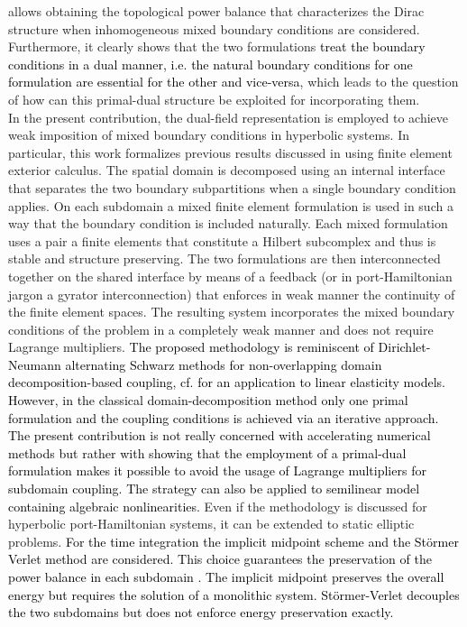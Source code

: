 \documentclass[11pt,a4paper]{article}
\newcommand{\revone}[1]{{\textcolor{black}{#1}}}
\newcommand{\revtwo}[1]{{\textcolor{black}{#1}}}
\begin{document}
allows obtaining the topological power balance that characterizes the Dirac structure when inhomogeneous mixed boundary conditions are considered. Furthermore, it clearly shows that the two formulations \revone{treat the boundary conditions in a dual manner, i.e. the natural boundary conditions for one formulation are essential for the other and vice-versa}, which leads to the question of how can this primal-dual structure be exploited for incorporating them.\\
 
 In the present contribution, the dual-field representation is employed to achieve weak imposition of mixed boundary conditions in hyperbolic systems. In particular, this work formalizes previous results discussed in \cite{brugnoli2020mixed,brugnoli2022explicit} using finite element exterior calculus. The spatial domain is decomposed using an internal interface that separates the two boundary subpartitions when a single boundary condition applies. On each subdomain a mixed finite element formulation is used in such a way that the boundary condition is included naturally. Each mixed formulation uses a pair a finite elements that constitute a Hilbert subcomplex and thus is stable and structure preserving. The two formulations are then interconnected together on the shared interface by means of a feedback (or in port-Hamiltonian jargon a gyrator interconnection) that enforces in weak manner the continuity of the finite element spaces. The resulting system incorporates the mixed boundary conditions of the problem in a completely weak manner and does not require Lagrange multipliers. \revone{The proposed methodology is reminiscent of Dirichlet-Neumann alternating Schwarz methods for non-overlapping domain decomposition-based coupling, cf. \cite{rodriguez2025transmission} for an application to linear elasticity models. However, in the classical domain-decomposition method only one primal formulation and the coupling conditions is achieved via an iterative approach. The present contribution is not really concerned with accelerating numerical methods but rather with showing that the employment of a primal-dual formulation makes it possible to avoid the usage of Lagrange multipliers for subdomain coupling.}  
 \revtwo{The strategy can also be applied to semilinear model containing algebraic nonlinearities.} Even if the methodology is discussed for hyperbolic port-Hamiltonian systems, it can be extended to static elliptic problems. \revone{For the time integration the implicit midpoint scheme and the St\"ormer Verlet method are considered. This choice guarantees the preservation of the power balance in each subdomain \cite{kotyczka2019discrete}. The implicit midpoint preserves the overall energy but requires the solution of a monolithic system. St\"ormer-Verlet decouples the two subdomains but does not enforce energy preservation exactly.} 
\end{document}
